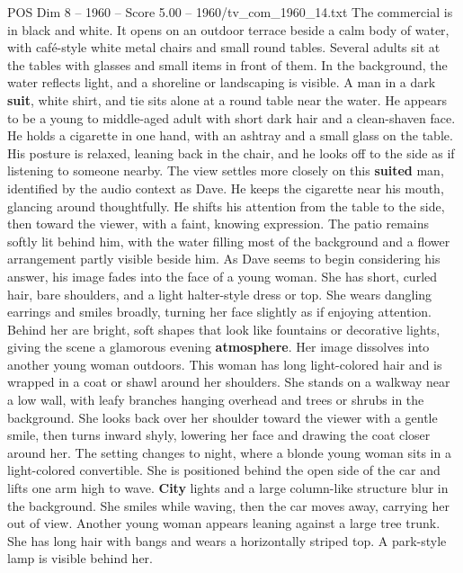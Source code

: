 \begin{textsample}{POS Dim 8 – 1960 – Score 5.00 – 1960/tv\_com\_1960\_14.txt}  \label{ex:f8_pos_085}
The commercial is in black and white.
It opens on an outdoor terrace beside a calm body of water, with café-style white metal chairs and small round tables.
Several adults sit at the tables with glasses and small items in front of them.
In the background, the water reflects light, and a shoreline or landscaping is visible.
A man in a dark \textbf{suit}, white shirt, and tie sits alone at a round table near the water.
He appears to be a young to middle-aged adult with short dark hair and a clean-shaven face.
He holds a cigarette in one hand, with an ashtray and a small glass on the table.
His posture is relaxed, leaning back in the chair, and he looks off to the side as if listening to someone nearby.
The view settles more closely on this \textbf{suited} man, identified by the audio context as Dave.
He keeps the cigarette near his mouth, glancing around thoughtfully.
He shifts his attention from the table to the side, then toward the viewer, with a faint, knowing expression.
The patio remains softly lit behind him, with the water filling most of the background and a flower arrangement partly visible beside him.
As Dave seems to begin considering his answer, his image fades into the face of a young woman.
She has short, curled hair, bare shoulders, and a light halter-style dress or top.
She wears dangling earrings and smiles broadly, turning her face slightly as if enjoying attention.
Behind her are bright, soft shapes that look like fountains or decorative lights, giving the scene a glamorous evening \textbf{atmosphere}.
Her image dissolves into another young woman outdoors.
This woman has long light-colored hair and is wrapped in a coat or shawl around her shoulders.
She stands on a walkway near a low wall, with leafy branches hanging overhead and trees or shrubs in the background.
She looks back over her shoulder toward the viewer with a gentle smile, then turns inward shyly, lowering her face and drawing the coat closer around her.
The setting changes to night, where a blonde young woman sits in a light-colored convertible.
She is positioned behind the open side of the car and lifts one arm high to wave. \textbf{City} lights and a large column-like structure blur in the background.
She smiles while waving, then the car moves away, carrying her out of view.
Another young woman appears leaning against a large tree trunk.
She has long hair with bangs and wears a horizontally striped top.
A park-style lamp is visible behind her.

\end{textsample}
